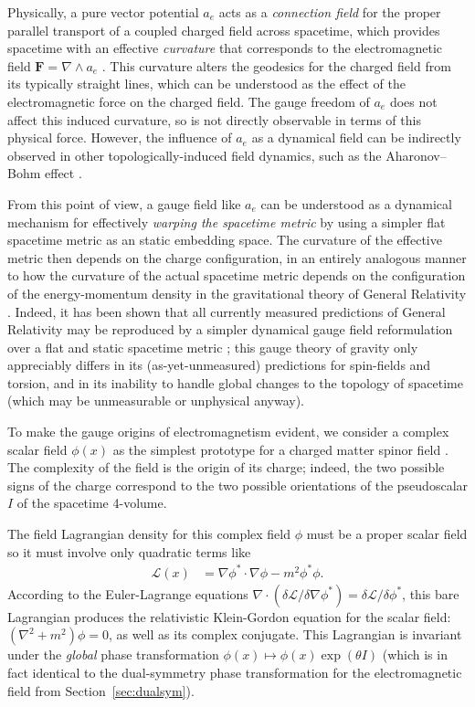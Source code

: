 \documentclass[1p,sort&compress]{elsarticle}
\numberwithin{equation}{section}
\newcommand{\bv}[1]{\mathbf{#1}}
\begin{document}
Physically, a pure vector potential $a_e$ acts as a \emph{connection field} for the proper parallel transport of a coupled charged field across spacetime, which provides spacetime with an effective \emph{curvature} that corresponds to the electromagnetic field $\bv{F} = \nabla\wedge a_e$ \cite{Yang1954,Yang1980,Yang2014,Yang2014b,Chern1974,THooft1972,Witten1988,Weinberg1995,Nakahara2003,Wu2006}.  This curvature alters the geodesics for the charged field from its typically straight lines, which can be understood as the effect of the electromagnetic force on the charged field.  The gauge freedom of $a_e$ does not affect this induced curvature, so is not directly observable in terms of this physical force.  However, the influence of $a_e$ as a dynamical field can be indirectly observed in other topologically-induced field dynamics, such as the Aharonov--Bohm effect \cite{Aharonov1959,Konopinski1978,Tonomura1986}.

From this point of view, a gauge field like $a_e$ can be understood as a dynamical mechanism for effectively \emph{warping the spacetime metric} by using a simpler flat spacetime metric as an static embedding space.  The curvature of the effective metric then depends on the charge configuration, in an entirely analogous manner to how the curvature of the actual spacetime metric depends on the configuration of the energy-momentum density in the gravitational theory of General Relativity \cite{Soper1976,Landau1975}.  Indeed, it has been shown that all currently measured predictions of General Relativity may be reproduced by a simpler dynamical gauge field reformulation over a flat and static spacetime metric \cite{Lasenby1998,Hestenes2005,Doran2007}; this gauge theory of gravity only appreciably differs in its (as-yet-unmeasured) predictions for spin-fields and torsion, and in its inability to handle global changes to the topology of spacetime (which may be unmeasurable or unphysical anyway).

To make the gauge origins of electromagnetism evident, we consider a complex scalar field $\phi(x)$ as the simplest prototype for a charged matter spinor field \cite{Weinberg1995}.  The complexity of the field is the origin of its charge; indeed, the two possible signs of the charge correspond to the two possible orientations of the pseudoscalar $I$ of the spacetime 4-volume.  

The field Lagrangian density for this complex field $\phi$ must be a proper scalar field so it must involve only quadratic terms like
\begin{align}\label{eq:barelagrangian}
  \mathcal{L}(x) &= \nabla\phi^* \cdot \nabla\phi - m^2 \phi^*\phi.
\end{align}
According to the Euler-Lagrange equations $\nabla \cdot (\delta\mathcal{L}/\delta\nabla\phi^*) = \delta\mathcal{L}/\delta\phi^*$, this bare Lagrangian produces the relativistic Klein-Gordon equation for the scalar field: $(\nabla^2 + m^2)\phi = 0$, as well as its complex conjugate.  This Lagrangian is invariant under the \emph{global} phase transformation $\phi(x) \mapsto \phi(x) \exp(\theta I)$ (which is in fact identical to the dual-symmetry phase transformation for the electromagnetic field from Section~\ref{sec:dualsym}).
\end{document}
